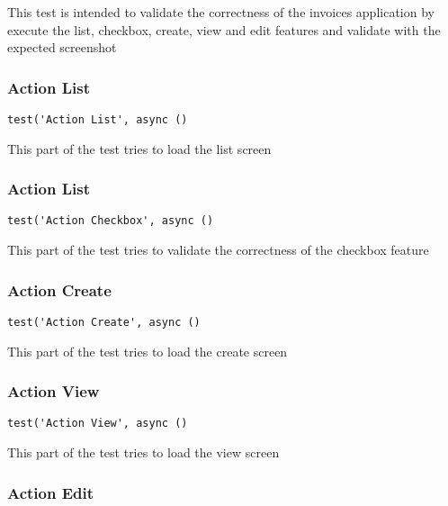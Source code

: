 \documentclass[a4paper]{article}
\begin{document}
This test is intended to validate the correctness of the invoices application
by execute the list, checkbox, create, view and edit features and validate with
the expected screenshot

\hypertarget{toc666}{}
\subsubsection{Action List}

\begin{lstlisting}
test('Action List', async ()
\end{lstlisting}

This part of the test tries to load the list screen

\hypertarget{toc667}{}
\subsubsection{Action List}

\begin{lstlisting}
test('Action Checkbox', async ()
\end{lstlisting}

This part of the test tries to validate the correctness of the checkbox
feature

\hypertarget{toc668}{}
\subsubsection{Action Create}

\begin{lstlisting}
test('Action Create', async ()
\end{lstlisting}

This part of the test tries to load the create screen

\hypertarget{toc669}{}
\subsubsection{Action View}

\begin{lstlisting}
test('Action View', async ()
\end{lstlisting}

This part of the test tries to load the view screen

\hypertarget{toc670}{}
\subsubsection{Action Edit}
\end{document}
